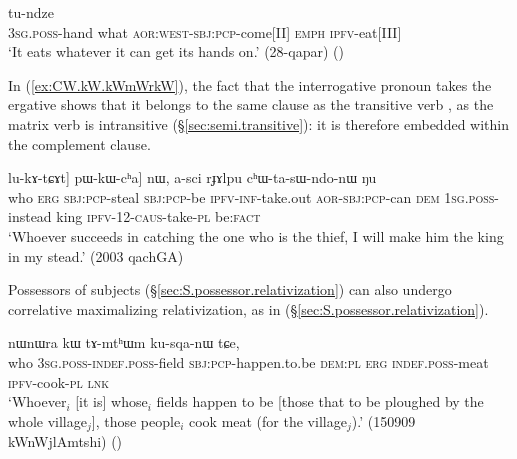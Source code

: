 \begin{exe}
\ex \label{ex:tChi.nWkWGe}
 tu-ndze \\
\textsc{3sg}.\textsc{poss}-hand what \textsc{aor}:\textsc{west}-\textsc{sbj}:\textsc{pcp}-come[II] \textsc{emph} \textsc{ipfv}-eat[III] \\
\glt `It eats whatever it can get its hands on.' (28-qapar)
()
\end{exe}


 In (\ref{ex:CW.kW.kWmWrkW}), the fact that the interrogative pronoun  takes the ergative shows that it belongs to the same clause as the transitive verb , as the matrix verb  is intransitive (§\ref{sec:semi.transitive}): it is therefore embedded within the complement clause.

\begin{exe}
\ex \label{ex:CW.kW.kWmWrkW}
\gll  [[\textbf{ɕɯ} kɯ [kɯ-mɯrkɯ kɯ-ŋu] lu-kɤ-tɕɤt] pɯ-kɯ-cʰa] nɯ, a-sci rɟɤlpu cʰɯ-ta-sɯ-ndo-nɯ ŋu \\
who \textsc{erg} \textsc{sbj}:\textsc{pcp}-steal  \textsc{sbj}:\textsc{pcp}-be \textsc{ipfv}-\textsc{inf}-take.out \textsc{aor}-\textsc{sbj}:\textsc{pcp}-can \textsc{dem} \textsc{1sg}.\textsc{poss}-instead king \textsc{ipfv}-1\fl{}2-\textsc{caus}-take-\textsc{pl} be:\textsc{fact} \\
\glt `Whoever succeeds in catching the one who is the thief, I will make him the king in my stead.' (2003 qachGA)
\end{exe}

Possessors of subjects (§\ref{sec:S.possessor.relativization}) can also undergo correlative maximalizing relativization, as in (§\ref{sec:S.possessor.relativization}).

\begin{exe}
\ex \label{ex:WtWji.kWnAtWG}
 nɯnɯra kɯ tɤ-mtʰɯm ku-sqa-nɯ tɕe, \\
who \textsc{3sg}.\textsc{poss}-\textsc{indef}.\textsc{poss}-field \textsc{sbj}:\textsc{pcp}-happen.to.be \textsc{dem}:\textsc{pl} \textsc{erg} \textsc{indef}.\textsc{poss}-meat \textsc{ipfv}-cook-\textsc{pl} \textsc{lnk} \\
\glt `Whoever$_i$ [it is] whose$_i$ fields happen to be [those that to be ploughed by the whole village$_j$], those people$_i$ cook meat (for the village$_j$).' (150909 kWnWjlAmtshi)
()
\end{exe}

